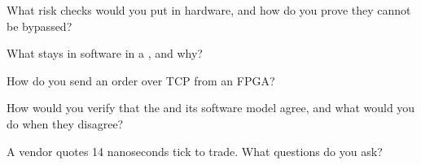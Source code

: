 \begin{interviewq}\label{iq:nw:programmable-hardware-ii-trading-designs:2}
What risk checks would you put in hardware, and how do you prove they cannot be bypassed?
\end{interviewq}

\begin{interviewq}\label{iq:nw:programmable-hardware-ii-trading-designs:3}
What stays in software in a , and why?
\end{interviewq}

\begin{interviewq}\label{iq:nw:programmable-hardware-ii-trading-designs:4}
How do you send an order over TCP from an FPGA?
\end{interviewq}

\begin{interviewq}\label{iq:nw:programmable-hardware-ii-trading-designs:5}
How would you verify that the  and its software model agree, and what would you do when they disagree?
\end{interviewq}

\begin{interviewq}\label{iq:nw:programmable-hardware-ii-trading-designs:6}
A vendor quotes 14 nanoseconds tick to trade. What questions do you ask?
\end{interviewq}
